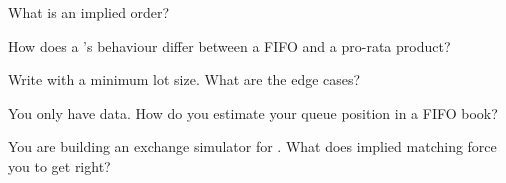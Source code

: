 \begin{interviewq}\label{iq:m1:matching-algorithms-and-implied-spreads:2}
What is an implied order?
\end{interviewq}

\begin{interviewq}\label{iq:m1:matching-algorithms-and-implied-spreads:3}
How does a 's behaviour differ between a FIFO and a pro-rata
product?
\end{interviewq}

\begin{interviewq}\label{iq:m1:matching-algorithms-and-implied-spreads:4}
Write  with a minimum lot size. What are the edge cases?
\end{interviewq}

\begin{interviewq}\label{iq:m1:matching-algorithms-and-implied-spreads:5}
You only have  data. How do you estimate your queue position
in a FIFO book?
\end{interviewq}

\begin{interviewq}\label{iq:m1:matching-algorithms-and-implied-spreads:6}
You are building an exchange simulator for . What does
implied matching force you to get right?
\end{interviewq}
